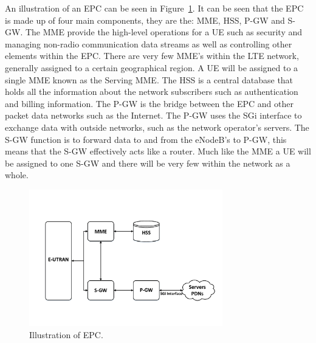 An illustration of an EPC can be seen in Figure~\ref{fig:epc}. It can be seen that the EPC is made up of four main components, they are the: \ac{MME}, \ac{HSS}, \ac{P-GW} and \ac{S-GW}. 
The MME provide the high-level operations for a UE such as security and managing non-radio communication data streams as well as controlling other elements within the EPC. There are very few MME's within the LTE network, generally assigned to a certain geographical region. A UE will be assigned to a single MME known as the Serving MME. 
The HSS is a central database that holds all the information about the network subscribers such as authentication and billing information.
The P-GW is the bridge between the EPC and other packet data networks such as the Internet. The P-GW uses the SGi interface to exchange data with outside networks, such as the network operator's servers.
The S-GW function is to forward data to and from the eNodeB's to P-GW, this means that the S-GW effectively acts like a router. Much like the MME a UE will be assigned to one S-GW and there will be very few within the network as a whole.~\cite{cox2012introduction, 3gpp2013network}

\begin{figure}[H]
  \begin{center}
    	  \includegraphics[width=0.75\textwidth]{figures/lte/epc.pdf}
    \end{center}
    \caption{Illustration of EPC.}
    \label{fig:epc}
\end{figure}

